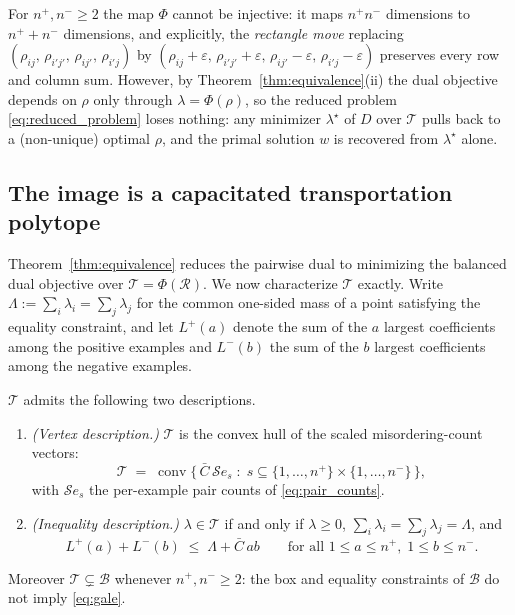 \begin{remark}
\label{rem:noninjective}
For $n^+, n^- \ge 2$ the map $\Phi$ cannot be injective: it maps
$n^+ n^-$ dimensions to $n^+ + n^-$ dimensions, and explicitly, the
\emph{rectangle move} replacing
$(\rho_{ij},\, \rho_{i'j'},\, \rho_{ij'},\, \rho_{i'j})$ by
$(\rho_{ij} + \varepsilon,\, \rho_{i'j'} + \varepsilon,\,
\rho_{ij'} - \varepsilon,\, \rho_{i'j} - \varepsilon)$
preserves every row and column sum. However, by
Theorem~\ref{thm:equivalence}(ii) the dual objective depends on $\rho$ only
through $\lambda = \Phi(\rho)$, so the reduced problem
\eqref{eq:reduced_problem} loses nothing: any minimizer $\lambda^\star$ of $D$
over $\mathcal{T}$ pulls back to a (non-unique) optimal $\rho$, and the primal
solution $w$ is recovered from $\lambda^\star$ alone.
\end{remark}

\subsection{The image is a capacitated transportation polytope}
\label{sec:image}

Theorem~\ref{thm:equivalence} reduces the pairwise dual to minimizing the
balanced dual objective over $\mathcal{T} = \Phi(\mathcal{R})$. We now
characterize $\mathcal{T}$ exactly. Write $\Lambda := \sum_i \lambda_i =
\sum_j \lambda_j$ for the common one-sided mass of a point satisfying the
equality constraint, and let $L^+(a)$ denote the sum of the $a$ largest
coefficients among the positive examples and $L^-(b)$ the sum of the $b$
largest coefficients among the negative examples.

\begin{theorem}
\label{thm:image}
$\mathcal{T}$ admits the following two descriptions.
\begin{enumerate}
\item[(i)] \emph{(Vertex description.)} $\mathcal{T}$ is the convex hull of
the scaled misordering-count vectors:
\[
\mathcal{T} \;=\; \operatorname{conv}
\bigl\{\, \bar{C}\, \mathcal{S} e_s \;:\; s \subseteq \{1,\dots,n^+\} \times
\{1,\dots,n^-\} \,\bigr\},
\]
with $\mathcal{S}e_s$ the per-example pair counts of \eqref{eq:pair_counts}.
\item[(ii)] \emph{(Inequality description.)} $\lambda \in \mathcal{T}$ if and
only if $\lambda \ge 0$, $\sum_i \lambda_i = \sum_j \lambda_j = \Lambda$, and
\begin{equation}
L^+(a) + L^-(b) \;\le\; \Lambda + \bar{C}\, a b
\qquad \text{for all } 1 \le a \le n^+, \; 1 \le b \le n^- .
\label{eq:gale}
\end{equation}
\end{enumerate}
Moreover $\mathcal{T} \subsetneq \mathcal{B}$ whenever $n^+, n^- \ge 2$: the
box and equality constraints of $\mathcal{B}$ do not imply \eqref{eq:gale}.
\end{theorem}

